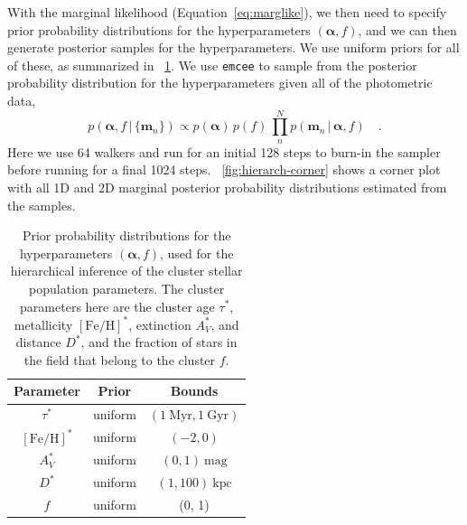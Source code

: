 \documentclass[twocolumn]{aastex62}
\newcommand{\bs}[1]{\boldsymbol{#1}}
\newcommand{\equationname}{Equation}
\newcommand{\given}{\,|\,}
\newcommand{\kpc}{\textrm{kpc}}
\newcommand{\feh}{\ensuremath{[\textrm{Fe} / \textrm{H}]}}
\begin{document}
With the marginal likelihood (\equationname~\ref{eq:marglike}), we then need to specify prior probability distributions for the hyperparameters $(\bs{\alpha}, f)$, and we can then generate posterior samples for the hyperparameters.
We use uniform priors for all of these, as summarized in \tablename~\ref{tbl:hyperpriors}.
We use \texttt{emcee} \citep{emcee, Goodman:2010} to sample from the posterior probability distribution for the hyperparameters given all of the photometric data,
\begin{equation}
    p(\bs{\alpha}, f \given \{\bs{m}_n\}) \propto
        p(\bs{\alpha}) \, p(f) \,
        \prod_n^N p(\bs{m}_n \given \bs{\alpha}, f) \quad.
\end{equation}
Here we use 64 walkers and run for an initial 128 steps to burn-in the sampler before running for a final 1024 steps.
\figurename~\ref{fig:hierarch-corner} shows a corner plot with all 1D and 2D marginal posterior probability distributions estimated from the samples.

\begin{table}[hbt]
\begin{center}
    \begin{tabular}{ c | c | c }
        \toprule
        Parameter & Prior & Bounds \\
        \toprule
        $\tau^*$ & uniform & $(1~\textrm{Myr}, 1~\textrm{Gyr})$ \\
        $\feh^*$ & uniform & $(-2, 0)$ \\
        $A_V^*$ & uniform & $(0, 1)~\textrm{mag}$ \\
        $D^*$ & uniform & $(1, 100)~\kpc$ \\
        $f$ & uniform & (0, 1) \\
        \toprule
    \end{tabular}
\caption{Prior probability distributions for the hyperparameters $(\bs{\alpha}, f)$, used for the hierarchical inference of the cluster stellar population parameters.
The cluster parameters here are the cluster age $\tau^*$, metallicity $\feh^*$, extinction $A_V^*$, and distance $D^*$, and the fraction of stars in the field that belong to the cluster $f$.
\label{tbl:hyperpriors}}
\end{center}
\end{table}
\end{document}
